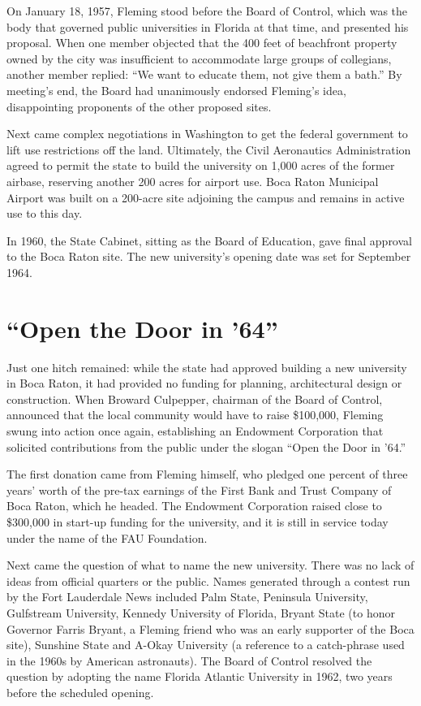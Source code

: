 \documentclass[phd, 12pt, print]{fauthesis}
\begin{document}
On January 18, 1957, Fleming stood before the Board of Control, which was the body that governed public universities in Florida at that time, and presented his proposal.  When one member objected that the 400 feet of beachfront property owned by the city was insufficient to accommodate large groups of collegians, another member replied: ``We want to educate them, not give them a bath.''  By meeting's end, the Board had unanimously endorsed Fleming's idea, disappointing proponents of the other proposed sites.

Next came complex negotiations in Washington to get the federal government to lift use restrictions off the land.  Ultimately, the Civil Aeronautics Administration agreed to permit the state to build the university on 1,000 acres of the former airbase, reserving another 200 acres for airport use.  Boca Raton Municipal Airport was built on a 200-acre site adjoining the campus and remains in active use to this day.

In 1960, the State Cabinet, sitting as the Board of Education, gave final approval to the Boca Raton site.  The new university's opening date was set for September 1964.

\section{``Open the Door in '64''}

Just one hitch remained: while the state had approved building a new university in Boca Raton, it had provided no funding for planning, architectural design or construction.  When Broward Culpepper, chairman of the Board of Control, announced that the local community would have to raise \$100,000, Fleming swung into action once again, establishing an Endowment Corporation that solicited contributions from the public under the slogan ``Open the Door in '64.''

The first donation came from Fleming himself, who pledged one percent of three years' worth of the pre-tax earnings of the First Bank and Trust Company of Boca Raton, which he headed.  The Endowment Corporation raised close to \$300,000 in start-up funding for the university, and it is still in service today under the name of the FAU Foundation.

Next came the question of what to name the new university.  There was no lack of ideas from official quarters or the public.  Names generated through a contest run by the Fort Lauderdale News included Palm State, Peninsula University, Gulfstream University, Kennedy University of Florida, Bryant State (to honor Governor Farris Bryant, a Fleming friend who was an early supporter of the Boca site), Sunshine State and A-Okay University (a reference to a catch-phrase used in the 1960s by American astronauts).  The Board of Control resolved the question by adopting the name Florida Atlantic University in 1962, two years before the scheduled opening.
\end{document}
